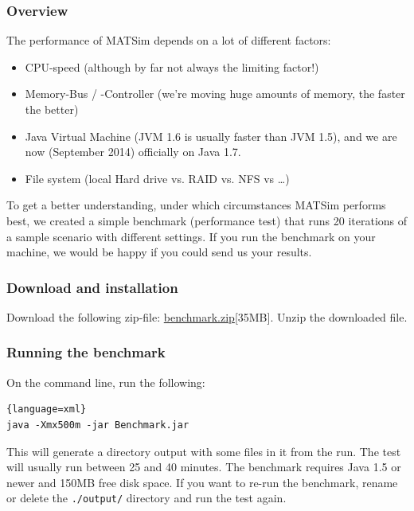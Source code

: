 \subsubsection{Overview}
The performance of MATSim depends on a lot of different factors:
\begin{itemize}
\item CPU-speed (although by far not always the limiting factor!)
\item Memory-Bus / -Controller (we're moving huge amounts of memory, the faster the better)
\item Java Virtual Machine (JVM 1.6 is usually faster than JVM 1.5), {\color{red} and we are now (September 2014) officially on Java 1.7}.
\item File system (local Hard drive vs. RAID vs. NFS vs \ldots)
\end{itemize}
To get a better understanding, under which circumstances MATSim performs best, we created a simple benchmark (performance test) that runs 20 iterations of a sample scenario with different settings. If you run the benchmark on your machine, we would be happy if you could send us your results.

\subsubsection{Download and installation}
Download the following zip-file: \href{http://matsim.org/files/benchmark/benchmark.zip}{benchmark.zip}{[35MB]}. Unzip the downloaded file.

\subsubsection{Running the benchmark}
On the command line, run the following:
\begin{lstlisting}{language=xml}
java -Xmx500m -jar Benchmark.jar
\end{lstlisting}
This will generate a directory output with some files in it from the run. The test will usually run between 25 and 40 minutes. The benchmark requires Java 1.5 or newer and 150MB free disk space. If you want to re-run the benchmark, rename or delete the \texttt{./output/} directory and run the test again.


